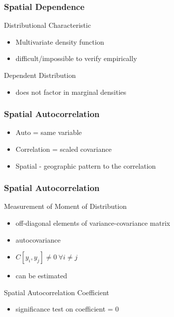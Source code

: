 \documentclass[nototal]{beamer}
\begin{document}
\begin{frame}
    \frametitle{Spatial Dependence}
    \begin{block}{Distributional Characteristic}
    \begin{itemize}
      \item Multivariate density function
      \item difficult/impossible to verify empirically
    \end{itemize}
  \end{block}
    \begin{block}{Dependent Distribution}
      \begin{itemize}
        \item does not factor in marginal densities
      \end{itemize}
    \end{block}
  \end{frame}


\begin{frame}
    \frametitle{Spatial Autocorrelation}
    \begin{itemize}
      \item Auto = same variable
      \item Correlation = scaled covariance
      \item Spatial - geographic pattern to the correlation
    \end{itemize}
  \end{frame}


\begin{frame}
    \frametitle{Spatial Autocorrelation}
    \begin{block}{Measurement of Moment of Distribution}
    \begin{itemize}
      \item off-diagonal elements of variance-covariance matrix
      \item autocovariance
      \item $C[y_i,y_j] \ne 0 \ \forall i\ne j$
      \item can be estimated
    \end{itemize}
  \end{block}
  \begin{block}{Spatial Autocorrelation Coefficient}
    \begin{itemize}
      \item significance test on coefficient = 0
    \end{itemize}
  \end{block}
  \end{frame}
\end{document}
